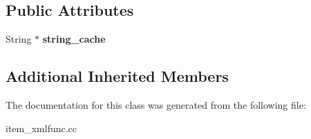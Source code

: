 \subsection*{Public Attributes}
\begin{DoxyCompactItemize}
\item 
\mbox{\label{classItem__nodeset__context__cache_ada31a9ab3594644ae83199d2a2fd2690}} 
String $\ast$ {\bfseries string\+\_\+cache}
\end{DoxyCompactItemize}
\subsection*{Additional Inherited Members}


The documentation for this class was generated from the following file\+:\begin{DoxyCompactItemize}
\item 
item\+\_\+xmlfunc.\+cc\end{DoxyCompactItemize}
